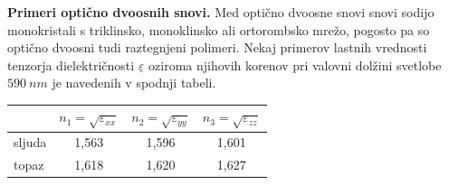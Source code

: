 \begin{example}{\bf Primeri optično dvoosnih snovi.}
Med optično dvoosne snovi snovi sodijo monokristali s triklinsko, 
monoklinsko ali ortorombsko mrežo, pogosto pa so optično dvoosni tudi raztegnjeni 
polimeri. Nekaj primerov lastnih vrednosti
tenzorja dielektričnosti $\underline{\varepsilon}$ oziroma njihovih korenov 
pri valovni dolžini svetlobe $590~\si{nm}$ je navedenih v spodnji tabeli.
\begin{center}
\begin{tabular}{|l|c|c|c|}
\hline
 & $n_1 = \sqrt{\varepsilon_{xx}}$ & $n_2 = \sqrt{\varepsilon_{yy}}$ & 
 $n_3 = \sqrt{\varepsilon_{zz}}$\\ \hline
sljuda & 1,563 & 1,596 & 1,601\\ \hline
topaz & 1,618 & 1,620 & 1,627 \\ \hline
\end{tabular}
\end{center}
\end{example}

